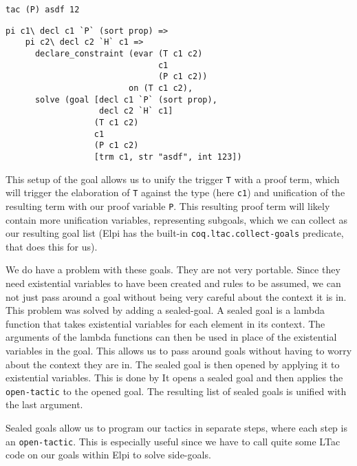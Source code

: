 \documentclass[thesis.tex]{subfiles}
\begin{document}
{{{\begin{minipage}[t]{0.2\linewidth}
\begin{verbatim}
tac (P) asdf 12
\end{verbatim}
\end{minipage}
\begin{minipage}[t]{0.45\linewidth}
  \begin{verbatim}
pi c1\ decl c1 `P` (sort prop) =>
    pi c2\ decl c2 `H` c1 =>
      declare_constraint (evar (T c1 c2) 
                               c1
                               (P c1 c2)) 
                         on (T c1 c2),
      solve (goal [decl c1 `P` (sort prop), 
                   decl c2 `H` c1] 
                  (T c1 c2)
                  c1 
                  (P c1 c2)
                  [trm c1, str "asdf", int 123])
\end{verbatim}
  \vspace{.1cm}
\end{minipage}

This setup of the goal allows us to unify the trigger \texttt{T} with a proof term, which will trigger the elaboration of \texttt{T} against the type (here \texttt{c1}) and unification of the resulting term with our proof variable \texttt{P}. This resulting proof term will likely contain more unification variables, representing subgoals, which we can collect as our resulting goal list (Elpi has the built-in \texttt{coq.ltac.collect-goals} predicate, that does this for us).

We do have a problem with these goals. They are not very portable. Since they need existential variables to have been created and rules to be assumed, we can not just pass around a goal without being very careful about the context it is in. This problem was solved by adding a sealed-goal. A sealed goal is a lambda function that takes existential variables for each element in its context. The arguments of the lambda functions can then be used in place of the existential variables in the goal. This allows us to pass around goals without having to worry about the context they are in. The sealed goal is then opened by applying it to existential variables. This is done by  It opens a sealed goal and then applies the \texttt{open-tactic} to the opened goal. The resulting list of sealed goals is unified with the last argument.

Sealed goals allow us to program our tactics in separate steps, where each step is an \texttt{open-tactic}. This is especially useful since we have to call quite some LTac code on our goals within Elpi to solve side-goals.

}}}
\end{document}
